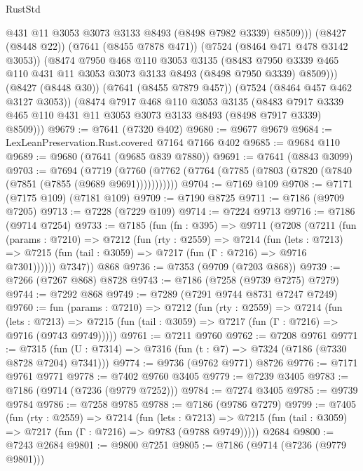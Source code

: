 \begin{lexlean}{RustStd}
\begin{coremodule}
{\begin{coremodule}
{{{{{{{{{{{{{{{{{{{{{{{{{{{{{{{{              @431
              @11
              @3053
              @3073
              @3133
              @8493
              (@8498 @7982 @3339)
              @8509)))
        (@8427 (@8448 @22))
        (@7641 (@8455 @7878 @471))
        (@7524 (@8464 @471 @478 @3142 @3053))
        (@8474
          @7950
          @468
          @110
          @3053
          @3135
          (@8483 @7950 @3339 @465 @110 @431 @11 @3053 @3073 @3133 @8493 (@8498 @7950 @3339) @8509)))
      (@8427 (@8448 @30))
      (@7641 (@8455 @7879 @457))
      (@7524 (@8464 @457 @462 @3127 @3053))
      (@8474
        @7917
        @468
        @110
        @3053
        @3135
        (@8483 @7917 @3339 @465 @110 @431 @11 @3053 @3073 @3133 @8493 (@8498 @7917 @3339) @8509)))
@9679 := @7641 (@7320 @402)
@9680 := @9677 @9679
@9684 := LexLeanPreservation.Rust.covered @7164 @7166 @402
@9685 := @9684 @110
@9689 := @9680 (@7641 (@9685 @839 @7880))
@9691 := @7641 (@8843 @3099)
@9703 := @7694
    (@7719 (@7760 (@7762 (@7764 (@7785 (@7803 (@7820 (@7840 (@7851 (@7855 (@9689 @9691)))))))))))
@9704 := @7169 @109
@9708 := @7171 (@7175 @109) (@7181 @109)
@9709 := @7190 @8725
@9711 := @7186 (@9709 @7205)
@9713 := @7228 (@7229 @109)
@9714 := @7224 @9713
@9716 := @7186 (@9714 @7254)
@9733 := @7185
    (fun (fn : @395) =>
    @9711
      (@7208
        (@7211
          (fun (params : @7210) =>
          @7212
            (fun (rty : @2559) =>
            @7214
              (fun (lets : @7213) =>
              @7215 (fun (tail : @3059) => @7217 (fun (Γ : @7216) => @9716 @7301))))))
        @7347))
    @868
@9736 := @7353 (@9709 (@7203 @868))
@9739 := @7266 (@7267 @868) @8728
@9743 := @7186 (@7258 (@9739 @7275) @7279)
@9744 := @7292 @868
@9749 := @7289 (@7291 @9744 @8731 @7247 @7249)
@9760 := fun (params : @7210) =>
  @7212
    (fun (rty : @2559) =>
    @7214
      (fun (lets : @7213) =>
      @7215 (fun (tail : @3059) => @7217 (fun (Γ : @7216) => @9716 (@9743 @9749)))))
@9761 := @7211 @9760
@9762 := @7208 @9761
@9771 := @7315 (fun (U : @7314) => @7316 (fun (t : @7) => @7324 (@7186 (@7330 @8728 @7204) @7341)))
@9774 := @9736 (@9762 @9771) @8726
@9776 := @7171 @9761 @9771
@9778 := @7402 @9760 @3405
@9779 := @7239 @3405
@9783 := @7186 (@9714 (@7236 (@9779 @7252)))
@9784 := @7274 @3405
@9785 := @9739 @9784
@9786 := @7258 @9785
@9788 := @7186 (@9786 @7279)
@9799 := @7405
    (fun (rty : @2559) =>
    @7214
      (fun (lets : @7213) =>
      @7215 (fun (tail : @3059) => @7217 (fun (Γ : @7216) => @9783 (@9788 @9749)))))
    @2684
@9800 := @7243 @2684
@9801 := @9800 @7251
@9805 := @7186 (@9714 (@7236 (@9779 @9801)))
}}}}}}}}}}}}}}}}}}}}}}}}}}}}}}}}
\end{coremodule}}
\end{coremodule}
\end{lexlean}
